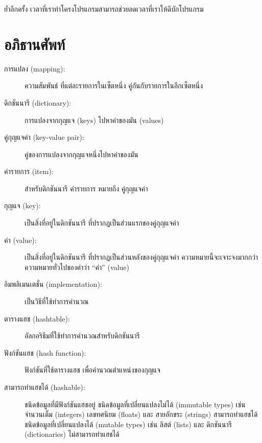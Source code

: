 ย้ำอีกครั้ง เวลาที่เราทำโครงโปรแกรมสามารถช่วยลดเวลาที่เราให้ดีบักโปรแกรม


\section{อภิธานศัพท์}

\begin{description}

\item[การแปลง (mapping):] ความสัมพันธ์ ที่แต่ละรายการในเซ็ตหนึ่ง คู่กันกับรายการในอีกเซ็ตหนึ่ง

\item[ดิกชันนารี (dictionary):] 
การแปลงจากกุญแจ (keys) ไปหาค่าของมัน (values)

\item[คู่กุญแจค่า (key-value pair):] 
คู่ของการแปลงจากกุญแจหนึ่งไปหาค่าของมัน

\item[ค่ารายการ (item):] สำหรับดิกชันนารี ค่ารายการ หมายถึง คู่กุญแจค่า

\item[กุญแจ (key):] เป็นสิ่งที่อยู่ในดิกชันนารี ที่ปรากฎเป็นส่วนแรกของคู่กุญแจค่า

\item[ค่า (value):] เป็นสิ่งที่อยู่ในดิกชันนารี ที่ปรากฎเป็นส่วนหลังของคู่กุญแจค่า
ความหมายนี้จะเจาะจงมากกว่าความหมายทั่วไปของคำว่า ``ค่า'' (value)

\item[อิมพลิเมนเตชั่น (implementation):] เป็นวิธีที่ใช้ทำการคำนวณ

\item[ตารางแฮช (hashtable):] อัลกอริธึมที่ใช้ทำการคำนวณสำหรับดิกชันนารี

\item[ฟังก์ชันแฮช (hash function):] ฟังก์ชันที่ใช้ตารางแฮช เพื่อคำนวณตำแหน่งของกุญแจ

\item[สามารถทำแฮชได้ (hashable):] ชนิดข้อมูลที่มีฟังก์ชันแฮชอยู่  
ชนิดข้อมูลที่เปลี่ยนแปลงไม่ได้ (immutable types) เช่น
จำนวนเต็ม (integers)
เลขทศนิยม (floats)
และ สายอักขระ (strings) สามารถทำแฮชได้
ชนิดข้อมูลที่เปลี่ยนแปลงได้ (mutable types) เช่น ลิสต์ (lists) และ
ดิกชันนารี (dictionaries) ไม่สามารถทำแฮชได้


\end{description}
